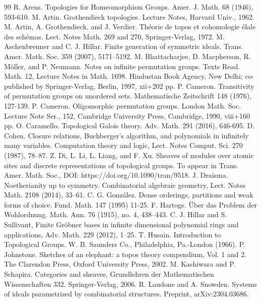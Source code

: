 \documentclass[11pt, reqno]{amsart}
\theoremstyle{plain}
\numberwithin{equation}{section}
\theoremstyle{definition}
\begin{document}
\begin{thebibliography}{99}
 R. Arens. Topologies for Homeomorphism Groups. Amer. J. Math. 68 (1946), 593-610.
 M. Artin. Grothendieck topologies. Lecture Notes, Harvard Univ., 1962.
 M. Artin, A. Grothendieck, and J. Verdier. Th\'{e}orie de topos et cohomologie \'{e}lale des sch\'{e}mas. Lect. Notes Math. 269 and 270, Springer-Verlag, 1972.
 M. Aschenbrenner and C. J. Hillar. Finite generation of symmetric ideals. Trans. Amer. Math. Soc. 359 (2007), 5171–5192.
 M. Bhattacharjee, D. Macpherson, R. M\"{o}ller, and P. Neumann. Notes on infinite permutation groups. Texts Read. Math. 12, Lecture Notes in Math. 1698. Hindustan Book Agency, New Delhi; co-published by Springer-Verlag, Berlin, 1997, xii+202 pp.
 P. Cameron. Transitivity of permutation groups on unordered sets. Mathematische Zeitschrift 148 (1976), 127-139.
 P. Cameron. Oligomorphic permutation groups. London Math. Soc. Lecture Note Ser., 152, Cambridge University Press, Cambridge, 1990, viii+160 pp.
 O. Caramello. Topological Galois theory. Adv. Math. 291 (2016), 646-695.
 D. Cohen. Closure relations, Buchberger’s algorithm, and polynomials in infinitely many variables. Computation theory and logic, Lect. Notes Comput. Sci. 270 (1987), 78–87.
 Z. Di, L. Li, L. Liang, and F. Xu. Sheaves of modules over atomic sites and discrete representations of topological groups. To appear in Trans. Amer. Math. Soc., DOI: https://doi.org/10.1090/tran/9518.
 J. Draisma. Noetherianity up to symmetry. Combinatorial algebraic geometry, Lect. Notes Math. 2108 (2014), 33–61.
 C. G. Gonz\'alez. Dense orderings, partitions and weak forms of choice. Fund. Math. 147 (1995) 11-25.
 F. Hartogs. \"Uber das Problem der Wohlordnung. Math. Ann. 76 (1915), no. 4, 438–443.
 C. J. Hillar and S. Sullivant, Finite Gr\"{o}bner bases in infinite dimensional polynomial rings and applications, Adv. Math. 229 (2012), 1–25.
 T. Husain. Introduction to Topological Groups. W. B. Saunders Co., Philadelphia, Pa.-London (1966).
 P. Johnstone. Sketches of an elephant: a topos theory compendium, Vol. 1 and 2. The Clarendon Press, Oxford University Press, 2002.
 M. Kashiwara and P. Schapira. Categories and sheaves, Grundlehren der Mathematischen Wissenschaften 332. Springer-Verlag, 2006.
 R. Laudone and A. Snowden. Systems of ideals parametrized by combinatorial structures. Preprint, arXiv:2304.03686.

\end{thebibliography}
\end{document}

